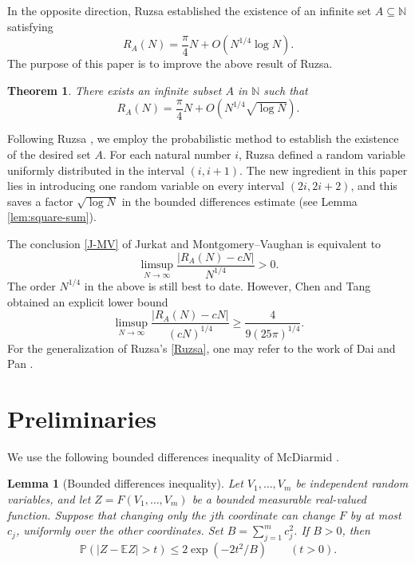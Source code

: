 \documentclass[12pt,reqno]{amsart}
\theoremstyle{plain}
\newtheorem{theorem}{Theorem}[section]
\newtheorem{lemma}{Lemma}[section]
\theoremstyle{definition}
\newcommand{\N}{\mathbb N}
\newcommand{\E}{\mathbb E}
\newcommand{\Prob}{\mathbb P}
\begin{document}
In the opposite direction, Ruzsa \cite{Ruzsa1997} established the existence of an
infinite set $A\subseteq \N$ satisfying
\begin{equation}\label{Ruzsa}
 R_A(N)=\frac{\pi}{4}N+O(N^{1/4}\log N).
\end{equation}
The purpose of this paper is to improve the above result of Ruzsa.

\begin{theorem}\label{thm:main}There exists an infinite subset $A$ in $\N$ such that
\begin{equation}\label{eq:main}
 R_A(N)=\frac{\pi}{4}N+
 O\!\left(N^{1/4}\sqrt{\log N}\right).
\end{equation}
\end{theorem}
Following Ruzsa \cite{Ruzsa1997}, we employ the probabilistic method to establish the existence of the desired set $A$. For each natural number $i$, Ruzsa defined a random variable uniformly distributed in the interval $(i,i+1)$. The new ingredient in this paper lies in introducing one random variable on every interval $(2i,2i+2)$, and this saves a factor $\sqrt{\log N}$ in the bounded differences estimate (see Lemma \ref{lem:square-sum}). 

The conclusion \eqref{J-MV} of Jurkat and
Montgomery--Vaughan is equivalent to
\[
 \limsup_{N\to\infty}\frac{|R_A(N)-cN|}{N^{1/4}}>0.
\]
The order $N^{1/4}$ in the above is still best to date. However, Chen and Tang \cite{CT2011} obtained an explicit lower bound 
\begin{equation}\label{eq:CTconstant}
 \limsup_{N\to\infty}
 \frac{|R_A(N)-cN|}{(cN)^{1/4}}
 \ge \frac{4}{9(25\pi)^{1/4}} .
\end{equation}
For the generalization of Ruzsa's \eqref{Ruzsa}, one may refer to the work of Dai and Pan \cite{DP2014}.

\section{Preliminaries}

\setcounter{equation}{0}

We use the following bounded differences
inequality of McDiarmid \cite{McD1989}.
\begin{lemma}[Bounded differences inequality]\label{lem:BD}
Let $V_1,\ldots,V_m$ be independent random variables, and let
$Z=F(V_1,\ldots,V_m)$ be a bounded measurable real-valued function.
Suppose that changing only the $j$th coordinate can change $F$ by at
most $c_j$, uniformly over the other coordinates. Set
$B=\sum_{j=1}^{m}c_j^2$. If $B>0$, then
\begin{equation*}
 \Prob(|Z-\E Z|>t)\le2\exp(-2t^2/B)\qquad(t>0).
\end{equation*}
\end{lemma}
\end{document}
